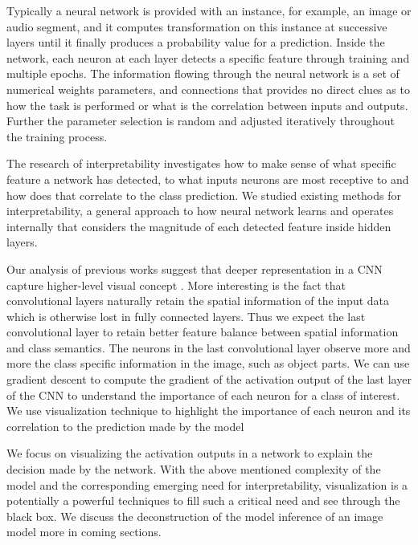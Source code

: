 Typically a neural network is provided with an instance, for example, an image or audio segment, and it computes transformation on this instance at successive layers until it finally produces a probability value for a prediction. Inside the network, each neuron at each layer detects a specific feature through training and multiple epochs. The information flowing through the neural network is a set of numerical weights parameters, and connections that provides no direct clues as to how the task is performed or what is the correlation between inputs and outputs. Further the parameter selection is random and adjusted iteratively throughout the training process. %

The research of interpretability investigates how to make sense of what specific feature a network has detected, to what inputs neurons are most receptive to and how does that correlate to the class prediction. We studied existing methods for interpretability, a general approach to how neural network learns and operates internally that considers the magnitude of each detected feature inside hidden layers.

Our analysis of previous works suggest that deeper representation in a CNN capture higher-level visual concept \cite{Zeiler}. More interesting is the fact that convolutional layers naturally retain the spatial information of the input data which is otherwise lost in fully connected layers. Thus we expect the last convolutional layer to retain better feature balance between spatial information and class semantics. The neurons in the last convolutional layer observe more and more the class specific information in the image, such as object parts. We can use gradient descent to compute the gradient of the activation output of the last layer of the CNN to understand the importance of each neuron for a class of interest. We use visualization technique to highlight the importance of each neuron and its correlation to the prediction made by the model

We focus on visualizing the activation outputs in a network to explain the decision made by the network. With the above mentioned complexity of the model and the corresponding emerging need for interpretability, visualization is a potentially a powerful techniques to fill such a critical need and see through the black box. We discuss the deconstruction of the model inference of an image model more in coming sections.

